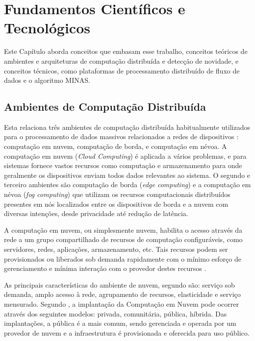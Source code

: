 
\chapter{Fundamentos Científicos e Tecnológicos}\label{cha:fundamentos}

Este Capítulo aborda conceitos que embasam esse trabalho,
conceitos teóricos de
ambientes e arquiteturas de computação distribuída e detecção de novidade,
e conceitos técnicos, como plataformas de processamento distribuído de fluxo
de dados e o algoritmo MINAS.

\section{Ambientes de Computação Distribuída}

Esta \Section relaciona três ambientes de computação distribuída habitualmente
utilizados para o processamento de dados massivos relacionados a redes de
dispositivos \iot: computação em nuvem, computação de borda, e computação em névoa.
A computação em nuvem (\emph{Cloud Computing}) é
aplicada a vários problemas, e para sistemas \iot 
fornece vastos recursos como computação e armazenamento para onde geralmente os dispositivos
enviam todos dados relevantes ao sistema.
O segundo e terceiro ambientes são computação de borda (\emph{edge computing})
e a computação em névoa (\emph{fog computing}) que utilizam os recursos
computacionais distribuídos presentes em nós localizados entre os dispositivos
de borda e a nuvem com diversas 
intenções, desde privacidade até redução de latência.


A computação em nuvem, ou simplesmente nuvem, habilita o acesso através da rede a um grupo compartilhado de
recursos de computação configuráveis, como servidores, redes, aplicações,
armazenamento, etc.
Tais recursos podem ser provisionados ou liberados sob
demanda rapidamente com o mínimo esforço de gerenciamento
e mínima interação com o provedor destes recursos \cite{NIST2011}.

As principais características do ambiente de nuvem, segundo 
são: serviço sob demanda, amplo acesso à rede, agrupamento de recursos,
elasticidade e serviço mensurado.
Segundo , a implantação da Computação em Nuvem pode
ocorrer através dos seguintes modelos: privada, comunitária, pública, híbrida.
Das implantações, a pública é a mais comum, sendo gerenciada e operada por um
provedor de nuvem e a infraestrutura é provisionada e oferecida para uso
público.

